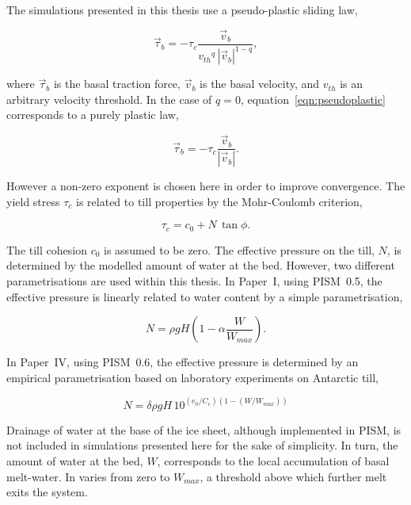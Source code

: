 \documentclass{article}
\begin{document}
The simulations presented in this thesis use a pseudo-plastic sliding law,

\begin{equation}
    \label{eqn:pseudoplastic}
    \vec{\tau}_b = -\tau_c \frac{\vec{v}_b}{{v_{th}}^q\,|\vec{v}_b|^{1-q}},
\end{equation}

where $\vec{\tau}_b$ is the basal traction force, $\vec{v}_b$ is the basal
velocity, and $v_{th}$ is an arbitrary velocity threshold. In the case of
$q=0$, equation~\ref{eqn:pseudoplastic} corresponds to a purely plastic law,

\begin{equation}
    \label{eqn:plastic}
    \vec{\tau}_b = -\tau_c \frac{\vec{v}_b}{|\vec{v}_b|}.
\end{equation}

However a non-zero exponent is chosen here in order to improve convergence. The
yield stress $\tau_c$ is related to till properties by the Mohr-Coulomb
criterion,

\begin{equation}
   \tau_c = c_0 + N\,\tan{\phi}.
\end{equation}

The till cohesion $c_0$ is assumed to be zero. The effective pressure on the
till, $N$, is determined by the modelled amount of water at the bed. However,
two different parametrisations are used within this thesis. In Paper~I, using
PISM~0.5, the effective pressure is linearly related to water content by a
simple parametrisation,

\begin{equation}
    N = \rho gH (1 - \alpha \frac{W}{W_{max}}).
\end{equation}

In Paper~IV, using PISM~0.6, the effective pressure is determined by an
empirical parametrisation based on laboratory experiments on Antarctic till,

\begin{equation}
    N = \delta \rho gH \, 10^{(e_0/C_c) (1 - (W/W_{max}))}
\end{equation}

Drainage of water at the base of the ice sheet, although implemented in PISM,
is not included in simulations presented here for the sake of simplicity.
In turn, the amount of water at the bed, $W$, corresponds to the local
accumulation of basal melt-water. In varies from zero to $W_{max}$, a threshold
above which further melt exits the system.
\end{document}
